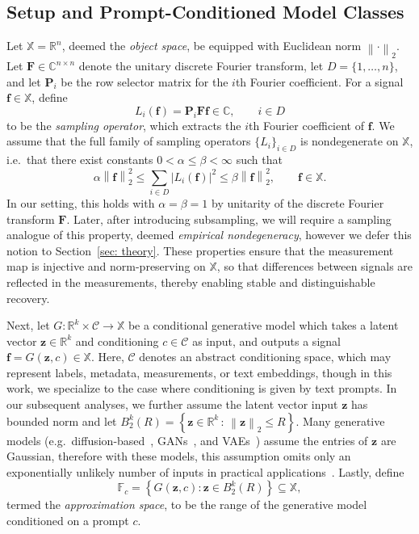 \documentclass{article}
\theoremstyle{plain}
\theoremstyle{definition}
\theoremstyle{remark}
\begin{document}
\subsection{Setup and Prompt-Conditioned Model Classes}
Let $\mathbb{X} = \mathbb{R}^n$, deemed the \emph{object space}, be equipped with Euclidean norm $\left\| \cdot \right\|_2$. Let $\mathbf{F} \in \mathbb{C}^{n \times n}$ denote the unitary discrete Fourier transform, let $D = \{1, \dots, n\}$, and let $\mathbf{P}_i$ be the row selector matrix for the $i$th Fourier coefficient. For a signal $\mathbf{f} \in \mathbb{X}$, define
\[
  L_i(\mathbf{f}) = \mathbf{P}_i \mathbf{F}\mathbf{f} \in \mathbb{C}, \qquad i \in D
\]
to be the \emph{sampling operator}, which extracts the $i$th Fourier coefficient of $\mathbf{f}$. We assume that the full family of sampling operators $\{L_i\}_{i \in D}$ is nondegenerate on $\mathbb{X}$, i.e.\ that there exist constants $0 < \alpha \le \beta < \infty$ such that
\[
  \alpha \left\|\mathbf{f}\right\|_2^2
  \le
  \sum_{i \in D} |L_i(\mathbf{f})|^2
  \le
  \beta \left\|\mathbf{f}\right\|_2^2,
  \qquad
  \mathbf{f} \in \mathbb{X}.
\]
In our setting, this holds with $\alpha = \beta = 1$ by unitarity of the discrete Fourier transform $\mathbf{F}$. Later, after introducing subsampling, we will require a sampling analogue of this property, deemed \emph{empirical nondegeneracy}, however we defer this notion to Section~\ref{sec: theory}. These properties ensure that the measurement map is injective and norm-preserving on $\mathbb{X}$, so that differences between signals are reflected in the measurements, thereby enabling stable and distinguishable recovery.

Next, let $G:\mathbb{R}^k\times\mathcal C\to\mathbb{X}$ be a conditional generative model which takes a latent vector $\mathbf{z} \in \mathbb{R}^k$ and conditioning $c \in \mathcal{C}$ as input, and outputs a signal $\mathbf{f} = G(\mathbf{z},c) \in \mathbb{X}$. Here, $\mathcal C$ denotes an abstract conditioning space, which may represent labels, metadata, measurements, or text embeddings, though in this work, we specialize to the case where conditioning is given by text prompts. In our subsequent analyses, we further assume the latent vector input $\mathbf{z}$ has bounded norm and let $B_2^k(R) = \left\{ \mathbf{z} \in \mathbb{R}^k \, : \, \left \| \mathbf{z} \right \|_2 \leq R \right\}$. Many generative models (e.g.\ diffusion-based~\cite{song2021scorebased,ho2020denoising,sohl2015deep}, GANs~\cite{goodfellow2014generative,radford2015unsupervised}, and VAEs~\cite{kingma2014auto}) assume the entries of $\mathbf{z}$ are Gaussian, therefore with these models, this assumption omits only an exponentially unlikely number of inputs in practical applications~\cite{bora2017compressed}. Lastly, define
\[
  \mathbb{F}_c = \left\{ G(\mathbf{z}, c) : \mathbf{z} \in B_2^k(R)\right\} \subseteq \mathbb{X},
\]
termed the \emph{approximation space}, to be the range of the generative model conditioned on a prompt $c$. 
\end{document}
